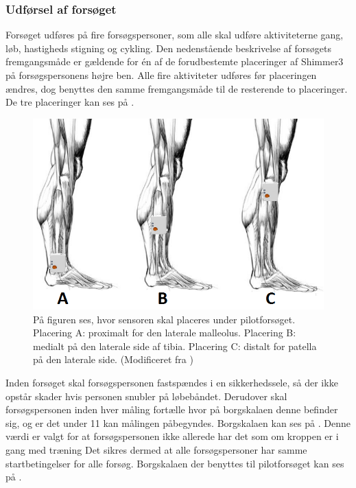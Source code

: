 \subsubsection{Udførsel af forsøget}
Forsøget udføres på fire forsøgspersoner, som alle skal udføre aktiviteterne gang, løb, hastigheds stigning og cykling. Den nedenstående beskrivelse af forsøgets fremgangsmåde er gældende for én af de forudbestemte placeringer af Shimmer3 på forsøgspersonens højre ben. Alle fire aktiviteter udføres før placeringen ændres, dog benyttes den samme fremgangsmåde til de resterende to placeringer. De tre placeringer kan ses på .

\begin{figure}[H]
	\centering
	\includegraphics[scale=0.55]{figures/qBilag/Sensor_placering2.png}
	\caption{På figuren ses, hvor sensoren skal placeres under pilotforsøget. Placering A: proximalt for den laterale malleolus. Placering B: medialt på den laterale side af tibia. Placering C: distalt for patella på den laterale side. (Modificeret fra \cite{Perna2016,Shimmer2016})}
	\label{fig:sensor_placering}
\end{figure}

Inden forsøget skal forsøgspersonen fastspændes i en sikkerhedssele, så der ikke opstår skader hvis personen snubler på løbebåndet. Derudover skal forsøgspersonen inden hver måling fortælle hvor på borgskalaen denne befinder sig, og er det under 11 kan målingen påbegyndes. Borgskalaen kan ses på . Denne værdi er valgt for at forsøgspersonen ikke allerede har det som om kroppen er i gang med træning Det sikres dermed at alle forsøgspersoner har samme startbetingelser for alle forsøg. Borgskalaen der benyttes til pilotforsøget kan ses på . 

